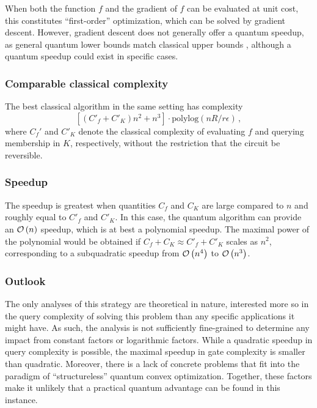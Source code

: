 \begin{refsection}
When both the function $f$ and the gradient of $f$ can be evaluated at unit cost, this constitutes ``first-order'' optimization, which can be solved by gradient descent. However, gradient descent does not generally offer a quantum speedup, as general quantum lower bounds match classical upper bounds \cite{garg2020noSpeedupGradDescent}, although a quantum speedup could exist in specific cases.

\subsubsection*{Comparable classical complexity}
The best classical algorithm \cite{lee2017ConvexOptWMemb} in the same setting has complexity 
\begin{equation}
    \left[(C'_f + C'_K)n^2 +n^3\right]\cdot \text{polylog}(nR/r\epsilon)\,,
\end{equation}
where $C_f'$ and $C'_K$ denote the classical complexity of evaluating $f$ and querying membership in $K$, respectively, without the restriction that the circuit be reversible. 

\subsubsection*{Speedup}
The speedup is greatest when quantities $C_f$ and $C_K$ are large compared to $n$ and roughly equal to $C'_f$ and $C'_K$. In this case, the quantum algorithm can provide an $\mathcal{O}\left( n \right)$ speedup, which is at best a polynomial speedup. The maximal power of the polynomial would be obtained if $C_f+C_K\approx C'_f+C'_K$ scales as $n^2$, corresponding to a subquadratic speedup from $\mathcal{O}\left( n^4 \right)$ to $\mathcal{O}\left( n^3 \right)$. 

 

\subsubsection*{Outlook}
The only analyses of this strategy are theoretical in nature, interested more so in the query complexity of solving this problem than any specific applications it might have. As such, the analysis is not sufficiently fine-grained to determine any impact from constant factors or logarithmic factors. While a quadratic speedup in query complexity is possible, the maximal speedup in gate complexity is smaller than quadratic. Moreover, there is a lack of concrete problems that fit into the paradigm of ``structureless'' quantum convex optimization. Together, these factors make it unlikely that a practical quantum advantage can be found in this instance. 

\printbibliography[heading=secbib,segment=\therefsegment]
\end{refsection}


